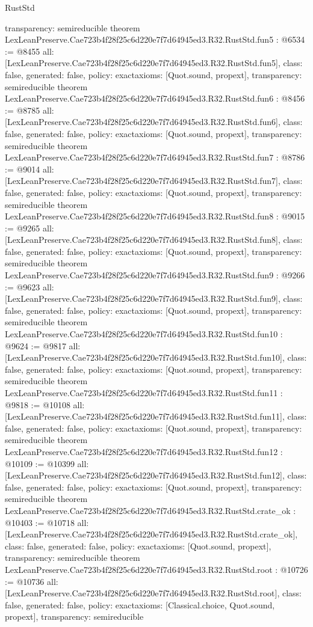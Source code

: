\begin{lexlean}{RustStd}
\begin{coremodule}
{  transparency: semireducible
}
theorem LexLeanPreserve.Cae723b4f28f25c6d220e7f7d64945ed3.R32.RustStd.fun5 : @6534 := @8455 {
  all: [LexLeanPreserve.Cae723b4f28f25c6d220e7f7d64945ed3.R32.RustStd.fun5],
  class: false,
  generated: false,
  policy: exact{axioms: [Quot.sound, propext]},
  transparency: semireducible
}
theorem LexLeanPreserve.Cae723b4f28f25c6d220e7f7d64945ed3.R32.RustStd.fun6 : @8456 := @8785 {
  all: [LexLeanPreserve.Cae723b4f28f25c6d220e7f7d64945ed3.R32.RustStd.fun6],
  class: false,
  generated: false,
  policy: exact{axioms: [Quot.sound, propext]},
  transparency: semireducible
}
theorem LexLeanPreserve.Cae723b4f28f25c6d220e7f7d64945ed3.R32.RustStd.fun7 : @8786 := @9014 {
  all: [LexLeanPreserve.Cae723b4f28f25c6d220e7f7d64945ed3.R32.RustStd.fun7],
  class: false,
  generated: false,
  policy: exact{axioms: [Quot.sound, propext]},
  transparency: semireducible
}
theorem LexLeanPreserve.Cae723b4f28f25c6d220e7f7d64945ed3.R32.RustStd.fun8 : @9015 := @9265 {
  all: [LexLeanPreserve.Cae723b4f28f25c6d220e7f7d64945ed3.R32.RustStd.fun8],
  class: false,
  generated: false,
  policy: exact{axioms: [Quot.sound, propext]},
  transparency: semireducible
}
theorem LexLeanPreserve.Cae723b4f28f25c6d220e7f7d64945ed3.R32.RustStd.fun9 : @9266 := @9623 {
  all: [LexLeanPreserve.Cae723b4f28f25c6d220e7f7d64945ed3.R32.RustStd.fun9],
  class: false,
  generated: false,
  policy: exact{axioms: [Quot.sound, propext]},
  transparency: semireducible
}
theorem LexLeanPreserve.Cae723b4f28f25c6d220e7f7d64945ed3.R32.RustStd.fun10 : @9624 := @9817 {
  all: [LexLeanPreserve.Cae723b4f28f25c6d220e7f7d64945ed3.R32.RustStd.fun10],
  class: false,
  generated: false,
  policy: exact{axioms: [Quot.sound, propext]},
  transparency: semireducible
}
theorem LexLeanPreserve.Cae723b4f28f25c6d220e7f7d64945ed3.R32.RustStd.fun11 : @9818 := @10108 {
  all: [LexLeanPreserve.Cae723b4f28f25c6d220e7f7d64945ed3.R32.RustStd.fun11],
  class: false,
  generated: false,
  policy: exact{axioms: [Quot.sound, propext]},
  transparency: semireducible
}
theorem LexLeanPreserve.Cae723b4f28f25c6d220e7f7d64945ed3.R32.RustStd.fun12 : @10109 := @10399 {
  all: [LexLeanPreserve.Cae723b4f28f25c6d220e7f7d64945ed3.R32.RustStd.fun12],
  class: false,
  generated: false,
  policy: exact{axioms: [Quot.sound, propext]},
  transparency: semireducible
}
theorem LexLeanPreserve.Cae723b4f28f25c6d220e7f7d64945ed3.R32.RustStd.crate_ok : @10403 := @10718 {
  all: [LexLeanPreserve.Cae723b4f28f25c6d220e7f7d64945ed3.R32.RustStd.crate_ok],
  class: false,
  generated: false,
  policy: exact{axioms: [Quot.sound, propext]},
  transparency: semireducible
}
theorem LexLeanPreserve.Cae723b4f28f25c6d220e7f7d64945ed3.R32.RustStd.root : @10726 := @10736 {
  all: [LexLeanPreserve.Cae723b4f28f25c6d220e7f7d64945ed3.R32.RustStd.root],
  class: false,
  generated: false,
  policy: exact{axioms: [Classical.choice, Quot.sound, propext]},
  transparency: semireducible
}


\end{coremodule}
\end{lexlean}
